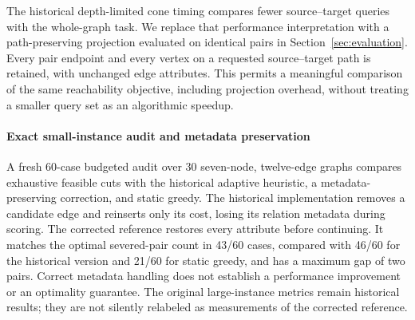 The historical depth-limited cone timing compares fewer source--target queries with the whole-graph task. We replace that performance interpretation with a path-preserving projection evaluated on identical pairs in Section~\ref{sec:evaluation}. Every pair endpoint and every vertex on a requested source--target path is retained, with unchanged edge attributes. This permits a meaningful comparison of the same reachability objective, including projection overhead, without treating a smaller query set as an algorithmic speedup.

\paragraph{Exact small-instance audit and metadata preservation}
A fresh 60-case budgeted audit over 30 seven-node, twelve-edge graphs compares exhaustive feasible cuts with the historical adaptive heuristic, a metadata-preserving correction, and static greedy. The historical implementation removes a candidate edge and reinserts only its cost, losing its relation metadata during scoring. The corrected reference restores every attribute before continuing. It matches the optimal severed-pair count in 43/60 cases, compared with 46/60 for the historical version and 21/60 for static greedy, and has a maximum gap of two pairs. Correct metadata handling does not establish a performance improvement or an optimality guarantee. The original large-instance metrics remain historical results; they are not silently relabeled as measurements of the corrected reference.
